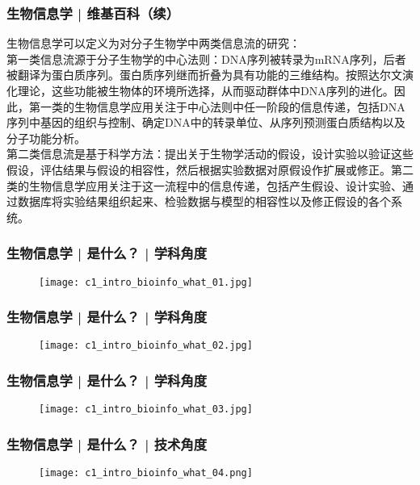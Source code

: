 \begin{frame}
  \frametitle{生物信息学 | 维基百科（续）}
  生物信息学可以定义为对分子生物学中两类信息流的研究：\\
  \vspace{1em}
  第一类信息流源于分子生物学的中心法则：DNA序列被转录为mRNA序列，后者被翻译为蛋白质序列。蛋白质序列继而折叠为具有功能的三维结构。按照达尔文演化理论，这些功能被生物体的环境所选择，从而驱动群体中DNA序列的进化。因此，第一类的生物信息学应用关注于中心法则中任一阶段的信息传递，包括DNA序列中基因的组织与控制、确定DNA中的转录单位、从序列预测蛋白质结构以及分子功能分析。\\
  \vspace{1em}
  第二类信息流是基于科学方法：提出关于生物学活动的假设，设计实验以验证这些假设，评估结果与假设的相容性，然后根据实验数据对原假设作扩展或修正。第二类的生物信息学应用关注于这一流程中的信息传递，包括产生假设、设计实验、通过数据库将实验结果组织起来、检验数据与模型的相容性以及修正假设的各个系统。
\end{frame}

\begin{frame}
  \frametitle{生物信息学 | 是什么？ | 学科角度}
  \begin{figure}
    \centering
    \texttt{[image: c1\_intro\_bioinfo\_what\_01.jpg]}
  \end{figure}
\end{frame}

\begin{frame}
  \frametitle{生物信息学 | 是什么？ | 学科角度}
  \begin{figure}
    \centering
    \texttt{[image: c1\_intro\_bioinfo\_what\_02.jpg]}
  \end{figure}
\end{frame}

\begin{frame}
  \frametitle{生物信息学 | 是什么？ | \alert{学科角度}}
  \begin{figure}
    \centering
    \texttt{[image: c1\_intro\_bioinfo\_what\_03.jpg]}
  \end{figure}
\end{frame}

\begin{frame}
  \frametitle{生物信息学 | 是什么？ | \alert{技术角度}}
  \begin{figure}
    \centering
    \texttt{[image: c1\_intro\_bioinfo\_what\_04.png]}
  \end{figure}
\end{frame}

